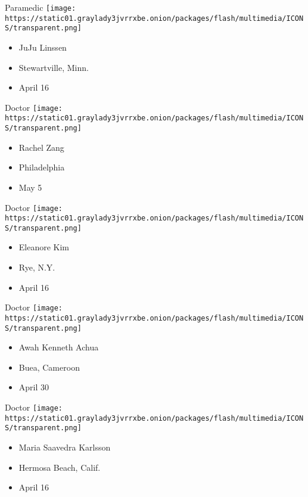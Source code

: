 \protect\hyperlink{item-juju-linssen}{}

Paramedic
\texttt{[image: https://static01.graylady3jvrrxbe.onion/packages/flash/multimedia/ICONS/transparent.png]}

\begin{itemize}
\tightlist
\item
  JuJu Linssen
\item
  Stewartville, Minn.
\item
  April 16
\end{itemize}

\protect\hyperlink{item-rachel-zang}{}

Doctor
\texttt{[image: https://static01.graylady3jvrrxbe.onion/packages/flash/multimedia/ICONS/transparent.png]}

\begin{itemize}
\tightlist
\item
  Rachel Zang
\item
  Philadelphia
\item
  May 5
\end{itemize}

\protect\hyperlink{item-eleanore-kim}{}

Doctor
\texttt{[image: https://static01.graylady3jvrrxbe.onion/packages/flash/multimedia/ICONS/transparent.png]}

\begin{itemize}
\tightlist
\item
  Eleanore Kim
\item
  Rye, N.Y.
\item
  April 16
\end{itemize}

\protect\hyperlink{item-awah-kenneth-achua}{}

Doctor
\texttt{[image: https://static01.graylady3jvrrxbe.onion/packages/flash/multimedia/ICONS/transparent.png]}

\begin{itemize}
\tightlist
\item
  Awah Kenneth Achua
\item
  Buea, Cameroon
\item
  April 30
\end{itemize}

\protect\hyperlink{item-maria-saavedra-karlsson}{}

Doctor
\texttt{[image: https://static01.graylady3jvrrxbe.onion/packages/flash/multimedia/ICONS/transparent.png]}

\begin{itemize}
\tightlist
\item
  Maria Saavedra Karlsson
\item
  Hermosa Beach, Calif.
\item
  April 16
\end{itemize}

